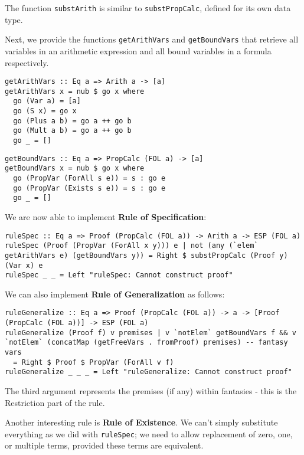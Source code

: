 \documentclass{article}
\begin{document}
The function \texttt{substArith} is similar to \texttt{substPropCalc}, defined for its own data type.

Next, we provide the functions \texttt{getArithVars} and \texttt{getBoundVars} that retrieve all variables in an arithmetic expression and all bound variables in a formula respectively.

\begin{minipage}{0.49\textwidth}
\begin{lstlisting}
getArithVars :: Eq a => Arith a -> [a]
getArithVars x = nub $ go x where
  go (Var a) = [a]
  go (S x) = go x
  go (Plus a b) = go a ++ go b
  go (Mult a b) = go a ++ go b
  go _ = []
\end{lstlisting}
\end{minipage}
\begin{minipage}{0.49\textwidth}
\begin{lstlisting}
getBoundVars :: Eq a => PropCalc (FOL a) -> [a]
getBoundVars x = nub $ go x where
  go (PropVar (ForAll s e)) = s : go e
  go (PropVar (Exists s e)) = s : go e
  go _ = []
\end{lstlisting}
\end{minipage}

We are now able to implement \textbf{Rule of Specification}:

\begin{lstlisting}
ruleSpec :: Eq a => Proof (PropCalc (FOL a)) -> Arith a -> ESP (FOL a)
ruleSpec (Proof (PropVar (ForAll x y))) e | not (any (`elem` getArithVars e) (getBoundVars y)) = Right $ substPropCalc (Proof y) (Var x) e
ruleSpec _ _ = Left "ruleSpec: Cannot construct proof"
\end{lstlisting}

We can also implement \textbf{Rule of Generalization} as follows:

\begin{lstlisting}
ruleGeneralize :: Eq a => Proof (PropCalc (FOL a)) -> a -> [Proof (PropCalc (FOL a))] -> ESP (FOL a)
ruleGeneralize (Proof f) v premises | v `notElem` getBoundVars f && v `notElem` (concatMap (getFreeVars . fromProof) premises) -- fantasy vars
  = Right $ Proof $ PropVar (ForAll v f)
ruleGeneralize _ _ _ = Left "ruleGeneralize: Cannot construct proof"
\end{lstlisting}

The third argument represents the premises (if any) within fantasies - this is the Restriction part of the rule.

Another interesting rule is \textbf{Rule of Existence}. We can't simply substitute everything as we did with \texttt{ruleSpec}; we need to allow replacement of zero, one, or multiple terms, provided these terms are equivalent.
\end{document}

